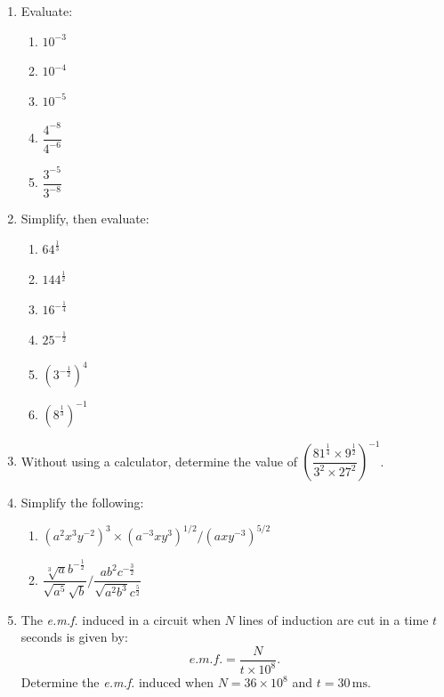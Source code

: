 \documentclass[
  english,
  12pt,
  oneside]{book}
\providecommand{\tightlist}{%
  \setlength{\itemsep}{0pt}\setlength{\parskip}{0pt}}
\theoremstyle{definition}
\theoremstyle{definition}
\theoremstyle{definition}
\theoremstyle{definition}
\theoremstyle{remark}
\begin{document}
\begin{enumerate}
  \begin{enumerate}
  \def\labelenumii{\alph{enumii})}
  \tightlist
  \item
    \(a^{13}a^{-2}\)
  \item
    \(x^{-9}x^{-7}\)
  \item
    \(x^{-21}x^2x\)
  \end{enumerate}
\item
  Evaluate:

  \begin{enumerate}
  \def\labelenumii{\alph{enumii})}
  \tightlist
  \item
    \(10^{-3}\)
  \item
    \(10^{-4}\)
  \item
    \(10^{-5}\)
  \item
    \(\dfrac{4^{-8}}{4^{-6}}\)
  \item
    \(\dfrac{3^{-5}}{3^{-8}}\)
  \end{enumerate}
\item
  Simplify, then evaluate:

  \begin{enumerate}
  \def\labelenumii{\alph{enumii})}
  \tightlist
  \item
    \(64^{\frac13}\)
  \item
    \(144^{\frac12}\)
  \item
    \(16^{-\frac14}\)
  \item
    \(25^{-\frac12}\)
  \item
    \(\left(3^{-\frac12}\right)^4\)
  \item
    \(\left(8^{\frac13}\right)^{-1}\)
  \end{enumerate}
\item
  Without using a calculator, determine the value of \(\left(\dfrac{81^{\frac14}\times 9^{\frac12}}{3^2\times 27^2}\right)^{-1}\).
\item
  Simplify the following:

  \begin{enumerate}
  \def\labelenumii{\roman{enumii})}
  \tightlist
  \item
    \((a^2 x^3 y^{-2})^3 \times (a^{-3}xy^3)^{1/2} / (axy^{-3})^{5/2}\)
  \item
    \(\dfrac{\sqrt[3]{a}b^{-\frac12}}{\sqrt{a^5}\sqrt{b}} / \dfrac{ab^2c^{-\frac32}}{\sqrt{a^2b^3}c^{\frac52}}\)
  \end{enumerate}
\item
  The \emph{e.m.f.} induced in a circuit when \(N\) lines of induction are cut in a time \(t\) seconds is given by:
  \[e.m.f. = \frac{N}{t\times 10^8}.\]
  Determine the \emph{e.m.f.} induced when \(N=36\times 10^8\) and \(t=30\,\mathrm{ms}\).
\end{enumerate}
\end{document}
